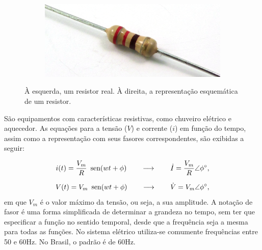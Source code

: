 \begin{figure}
    \centering
    \begin{subfigure}[b]{0.3\textwidth}
        \centering
        \includegraphics[width=\textwidth]{anexos/resistor.png}
    \end{subfigure}
    \hspace{1cm}
    \begin{subfigure}[b]{0.3\textwidth}
        \centering
    \end{subfigure}
    

    \caption{À esquerda, um resistor real. À direita, a representação esquemática de um resistor.}
    \label{fig:three graphs}
\end{figure}


São equipamentos com características resistivas, como chuveiro elétrico
e aquecedor. As equações para a tensão ($V$) e corrente ($i$) em
função do tempo, assim como a representação com seus fasores correspondentes,
são exibidas a seguir:

\[
i(t)=\frac{V_{m}}{R}\mbox{\, sen}(wt+\phi)\qquad\longrightarrow\qquad\dot{I}=\frac{V_{m}}{R}\angle\phi^{\circ},
\]


\[
V(t)=V_{m}\mbox{\, sen}(wt+\phi)\qquad\longrightarrow\qquad\dot{V}=V_{m}\angle\phi^{\circ},
\]
em que $V_{m}$ é o valor máximo da tensão, ou seja, a sua amplitude.
A notação de fasor é uma forma simplificada de determinar a grandeza
no tempo, sem ter que especificar a função no sentido temporal, desde
que a frequência seja a mesma para todas as funções. No sistema elétrico utiliza-se comumente
frequências entre 50 e 60Hz. No Brasil, o padrão é de 60Hz. 

